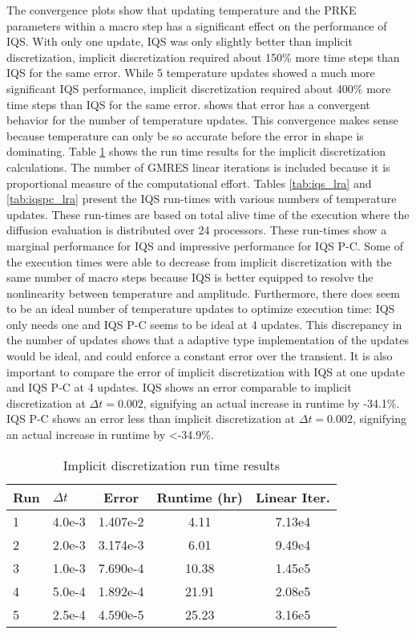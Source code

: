 The convergence plots show that updating temperature and the PRKE parameters within a macro step has a significant effect on the performance of IQS.  With only one update, IQS was only slightly better than implicit discretization, implicit discretization required about 150\% more time steps than IQS for the same error.  While 5 temperature updates showed a much more significant IQS performance, implicit discretization required about 400\% more time steps than IQS for the same error.   shows that error has a convergent behavior for the number of temperature updates.  This convergence makes sense because temperature can only be so accurate before the error in shape is dominating. Table \ref{tab:ndiff_lra} shows the run time results for the implicit discretization calculations. The number of GMRES linear iterations is included because it is proportional measure of the computational effort. Tables \ref{tab:iqs_lra} and \ref{tab:iqspc_lra} present the IQS run-times with various numbers of temperature updates.  These run-times are based on total alive time of the execution where the diffusion evaluation is distributed over 24 processors. These run-times show a marginal performance for IQS and impressive performance for IQS P-C.  Some of the execution times were able to decrease from implicit discretization with the same number of macro steps because IQS is better equipped to resolve the nonlinearity between temperature and amplitude. Furthermore, there does seem to be an ideal number of temperature updates to optimize execution time: IQS only needs one and IQS P-C seems to be ideal at 4 updates. This discrepancy in the number of updates shows that a adaptive type implementation of the updates would be ideal, and could enforce a constant error over the transient. It is also important to compare the error of implicit discretization with IQS at one update and IQS P-C at 4 updates.  IQS shows an error comparable to implicit discretization at $\Delta t = 0.002$, signifying an actual increase in runtime by -34.1\%.  IQS P-C shows an error less than implicit discretization at $\Delta t = 0.002$, signifying an actual increase in runtime by <-34.9\%.

\begin{table}[!htbp]
\begin{center}
\begin{tabular}{|l|l|ccc|}
\hline
Run  &  $\Delta t$ & Error & Runtime (hr) & Linear Iter.\\
\hline
1	& 4.0e-3	& 1.407e-2 	& 4.11	& 7.13e4	\\
2	& 2.0e-3	& 3.174e-3 	& 6.01	& 9.49e4 	\\
3 	& 1.0e-3 	& 7.690e-4 	& 10.38	& 1.45e5	\\
4 	& 5.0e-4 	& 1.892e-4 	& 21.91	& 2.08e5	\\
5 	& 2.5e-4	& 4.590e-5 	& 25.23	& 3.16e5	\\
\hline
\end{tabular}
\end{center}
\caption{Implicit discretization run time results}
\label{tab:ndiff_lra}
\end{table}

